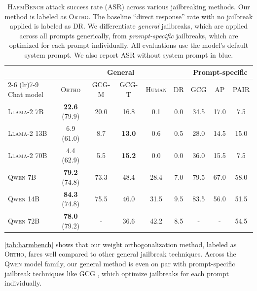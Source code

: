\documentclass{article}
\begin{document}
\begin{table}[b]
\caption{
\textsc{HarmBench} attack success rate (ASR) across various jailbreaking methods.
Our method is labeled as \textsc{Ortho}.
The baseline ``direct response'' rate with no jailbreak applied is labeled as \textsc{DR}.
We differentiate \emph{general} jailbreaks, which are applied across all prompts generically, from {\color{prompt_specific}\emph{prompt-specific} jailbreaks}, which are optimized for each prompt individually. All evaluations use the model's default system prompt. We also report {\color{no_system} ASR without system prompt in blue}.}
\label{tab:harmbench}
\centering
\begin{tabularx}{\textwidth}{l ccccc>{\color{prompt_specific}}c>{\color{prompt_specific}}c>{\color{prompt_specific}}c}
\toprule
& \multicolumn{5}{c}{General} & \multicolumn{3}{c}{\color{prompt_specific}Prompt-specific} \\
\cmidrule(lr){2-6} \cmidrule(lr){7-9}
Chat model & \textsc{Ortho} & \textsc{GCG-M} & \textsc{GCG-T} & \textsc{Human} & \textsc{DR} & \textsc{GCG} & \textsc{AP} & \textsc{PAIR} \\
\midrule
\textsc{Llama-2 7B} & \textbf{22.6} {\color{no_system}(79.9)} & 20.0 & 16.8 & \phantom{0}0.1 & 0.0 & 34.5 & 17.0 & \phantom{0}7.5 \\
\textsc{Llama-2 13B} & \phantom{0}6.9 {\color{no_system}(61.0)} & \phantom{0}8.7 & \textbf{13.0} & \phantom{0}0.6 & 0.5 & 28.0 & 14.5 & 15.0 \\
\textsc{Llama-2 70B} & \phantom{0}4.4 {\color{no_system}(62.9)} & \phantom{0}5.5 & \textbf{15.2} & \phantom{0}0.0 & 0.0 & 36.0 & 15.5 & \phantom{0}7.5 \\
\textsc{Qwen 7B} & \textbf{79.2} {\color{no_system}(74.8)} & 73.3 & 48.4 & 28.4 & 7.0 & 79.5 & 67.0 & 58.0 \\
\textsc{Qwen 14B} & \textbf{84.3} {\color{no_system}(74.8)} & 75.5 & 46.0 & 31.5 & 9.5 & 83.5 & 56.0 & 51.5 \\
\textsc{Qwen 72B} & \textbf{78.0} {\color{no_system}(79.2)} & - & 36.6 & 42.2 & 8.5 & - & - & 54.5 \\
\bottomrule
\end{tabularx}
\end{table}

\autoref{tab:harmbench} shows that our weight orthogonalization method, labeled as \textsc{Ortho}, fares well compared to other general jailbreak techniques.
Across the \textsc{Qwen} model family, our general method is even on par with prompt-specific jailbreak techniques like \textsc{GCG} \citep{zou2023universal}, which optimize jailbreaks for each prompt individually.
\end{document}
